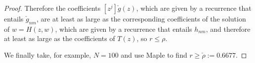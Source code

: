 \documentclass[10pt,a4paper]{amsart}
\begin{document}
\begin{proof}
Therefore the coefficients $[z^j]\check{g}(z)$, which are given by a recurrence that entails $\check{g}_{nm}$, 
 are at least as large as the corresponding coefficients of the solution of $w = H(z,w)$, which are given by a recurrence that entails $h_{nm}$, 
 and therefore at least as large as the coefficients of $T(z)$, so $r \leq \rho$.
 
 
 
   
   We finally take, for example, $N=100$ and use Maple to find $r \geq \check{\rho} := 0.6677.$ \end{proof}   
\end{document}
